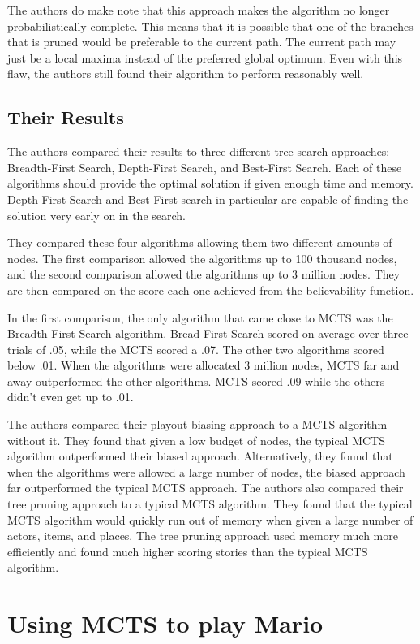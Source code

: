 \documentclass{sig-alternate}
\begin{document}
The authors do make note that this approach makes the algorithm no longer probabilistically complete. This means that it is possible that one of the branches that is pruned would be preferable to the current path. The current path may just be a local maxima instead of the preferred global optimum. Even with this flaw, the authors still found their algorithm to perform reasonably well. 

\subsection{Their Results}
The authors compared their results to three different tree search approaches: Breadth-First Search, Depth-First Search, and Best-First Search\cite{Narrative}. Each of these algorithms should provide the optimal solution if given enough time and memory. Depth-First Search and Best-First search in particular are capable of finding the solution very early on in the search.

They compared these four algorithms allowing them two different amounts of nodes. The first comparison allowed the algorithms up to 100 thousand nodes, and the second comparison allowed the algorithms up to 3 million nodes. They are then compared on the score each one achieved from the believability function.

In the first comparison, the only algorithm that came close to MCTS was the Breadth-First Search algorithm. Bread-First Search scored on average over three trials of .05, while the MCTS scored a .07. The other two algorithms scored below .01. When the algorithms were allocated 3 million nodes, MCTS far and away outperformed the other algorithms. MCTS scored .09 while the others didn't even get up to .01.

The authors compared their playout biasing approach to a MCTS algorithm without it. They found that given a low budget of nodes, the typical MCTS algorithm outperformed their biased approach. Alternatively, they found that when the algorithms were allowed a large number of nodes, the biased approach far outperformed the typical MCTS approach. The authors also compared their tree pruning approach to a typical MCTS algorithm. They found that the typical MCTS algorithm would quickly run out of memory when given a large number of actors, items, and places. The tree pruning approach used memory much more efficiently and found much higher scoring stories than the typical MCTS algorithm.

\section{Using MCTS to play Mario}
\end{document}
